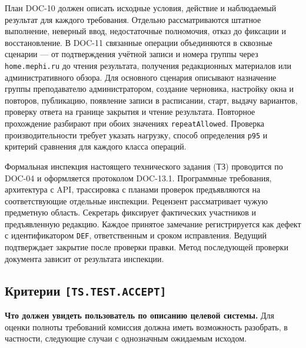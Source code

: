 \documentclass[12pt,a4paper]{article}
\begin{document}
\hypertarget{61-порядок-контроля-tstestver}{}

\hypertarget{ts-test-ver}{}

План DOC-10 должен описать исходные условия, действие и наблюдаемый результат для каждого требования. Отдельно рассматриваются штатное выполнение, неверный ввод, недостаточные полномочия, отказ до фиксации и восстановление. В DOC-11 связанные операции объединяются в сквозные сценарии --- от подтверждения учётной записи и номера группы через \texttt{home.\allowbreak{}mephi.\allowbreak{}ru} до чтения результата, получения редакционных материалов или административного обзора. Для основного сценария описывают назначение группы преподавателю администратором, создание черновика, настройку окна и повторов, публикацию, появление записи в расписании, старт, выдачу вариантов, проверку ответа на границе закрытия и чтение результата. Повторное прохождение разбирают при обоих значениях \texttt{repeatAllowed}. Проверка производительности требует указать нагрузку, способ определения \texttt{p95} и критерий сравнения для каждого класса операций.

Формальная инспекция настоящего технического задания (ТЗ) проводится по DOC-04 и оформляется протоколом DOC-13.1. Программные требования, архитектура с API, трассировка с планами проверок предъявляются на соответствующие отдельные инспекции. Рецензент рассматривает чужую предметную область. Секретарь фиксирует фактических участников и предъявленную редакцию. Каждое принятое замечание регистрируется как дефект с идентификатором \texttt{DEF}, ответственным и сроком исправления. Ведущий подтверждает закрытие после проверки правки. Метод последующей проверки документа зависит от результата инспекции.

\subsection{\texorpdfstring{Критерии \texttt{[TS.\allowbreak{}TEST.\allowbreak{}ACCEPT]}}{Критерии }}\label{62-ux43aux440ux438ux442ux435ux440ux438ux438-tstestaccept}

\hypertarget{62-критерии-tstestaccept}{}

\hypertarget{ts-test-accept}{}

\textbf{Что должен увидеть пользователь по описанию целевой системы.} Для оценки полноты требований комиссия должна иметь возможность разобрать, в частности, следующие случаи с однозначным ожидаемым исходом.
\end{document}
